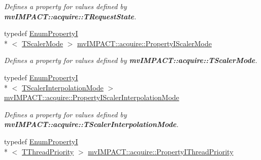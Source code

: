 \begin{DoxyCompactItemize}
\begin{DoxyCompactList}\small\item\em Defines a property for values defined by {\bfseries mv\+I\+M\+P\+A\+C\+T\+::acquire\+::\+T\+Request\+State}. \end{DoxyCompactList}\item 
\hypertarget{group___common_interface_ga0adb8ca6f3c1ff4cc9813bcee143580f}{typedef \hyperlink{classmv_i_m_p_a_c_t_1_1acquire_1_1_enum_property_i}{Enum\+Property\+I}\\*
$<$ \hyperlink{group___common_interface_ga7ccd01e604cab9a5204ff969298fcc29}{T\+Scaler\+Mode} $>$ \hyperlink{group___common_interface_ga0adb8ca6f3c1ff4cc9813bcee143580f}{mv\+I\+M\+P\+A\+C\+T\+::acquire\+::\+Property\+I\+Scaler\+Mode}}\label{group___common_interface_ga0adb8ca6f3c1ff4cc9813bcee143580f}

\begin{DoxyCompactList}\small\item\em Defines a property for values defined by {\bfseries mv\+I\+M\+P\+A\+C\+T\+::acquire\+::\+T\+Scaler\+Mode}. \end{DoxyCompactList}\item 
\hypertarget{group___common_interface_ga935c38ccadc072128888280fa7a78e0e}{typedef \hyperlink{classmv_i_m_p_a_c_t_1_1acquire_1_1_enum_property_i}{Enum\+Property\+I}\\*
$<$ \hyperlink{group___common_interface_gae0752aaeb2b62ddbcf4782bbf0205f41}{T\+Scaler\+Interpolation\+Mode} $>$ \hyperlink{group___common_interface_ga935c38ccadc072128888280fa7a78e0e}{mv\+I\+M\+P\+A\+C\+T\+::acquire\+::\+Property\+I\+Scaler\+Interpolation\+Mode}}\label{group___common_interface_ga935c38ccadc072128888280fa7a78e0e}

\begin{DoxyCompactList}\small\item\em Defines a property for values defined by {\bfseries mv\+I\+M\+P\+A\+C\+T\+::acquire\+::\+T\+Scaler\+Interpolation\+Mode}. \end{DoxyCompactList}\item 
\hypertarget{group___common_interface_ga3d8854715fb4cb82a7d770ba632ae479}{typedef \hyperlink{classmv_i_m_p_a_c_t_1_1acquire_1_1_enum_property_i}{Enum\+Property\+I}\\*
$<$ \hyperlink{group___common_interface_ga2dc400c438444996449c9d056c0883cf}{T\+Thread\+Priority} $>$ \hyperlink{group___common_interface_ga3d8854715fb4cb82a7d770ba632ae479}{mv\+I\+M\+P\+A\+C\+T\+::acquire\+::\+Property\+I\+Thread\+Priority}}\label{group___common_interface_ga3d8854715fb4cb82a7d770ba632ae479}


\end{DoxyCompactItemize}
